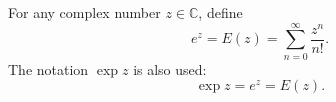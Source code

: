 For any complex number $z \in \mathbb{C}$, define
$$e^z = E(z) = \sum_{n=0}^{\infty} \frac{z^n}{n!}.$$
The notation $\exp z$ is also used:
$$\exp z = e^z = E(z).$$
